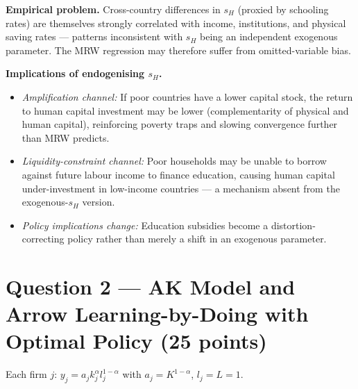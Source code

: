 \documentclass[a4paper,11pt]{article}
\begin{document}
\begin{enumerate}[label=\textbf{(\arabic*)},leftmargin=*]
\begin{answerbox}
\textbf{Empirical problem.} Cross-country differences in $s_H$ (proxied by schooling rates) are themselves strongly correlated with income, institutions, and physical saving rates --- patterns inconsistent with $s_H$ being an independent exogenous parameter. The MRW regression may therefore suffer from omitted-variable bias.

\textbf{Implications of endogenising $s_H$.}
\begin{itemize}
  \item \emph{Amplification channel:} If poor countries have a lower capital stock, the return to human capital investment may be lower (complementarity of physical and human capital), reinforcing poverty traps and slowing convergence further than MRW predicts.
  \item \emph{Liquidity-constraint channel:} Poor households may be unable to borrow against future labour income to finance education, causing human capital under-investment in low-income countries --- a mechanism absent from the exogenous-$s_H$ version.
  \item \emph{Policy implications change:} Education subsidies become a distortion-correcting policy rather than merely a shift in an exogenous parameter.
\end{itemize}
\end{answerbox}

\end{enumerate}

\clearpage

\section*{Question 2 --- AK Model and Arrow Learning-by-Doing with Optimal Policy \hfill (25 points)}

Each firm $j$: $y_j = a_j k_j^{\alpha} l_j^{1-\alpha}$ with $a_j = K^{1-\alpha}$, $l_j = L = 1$.
\end{document}
